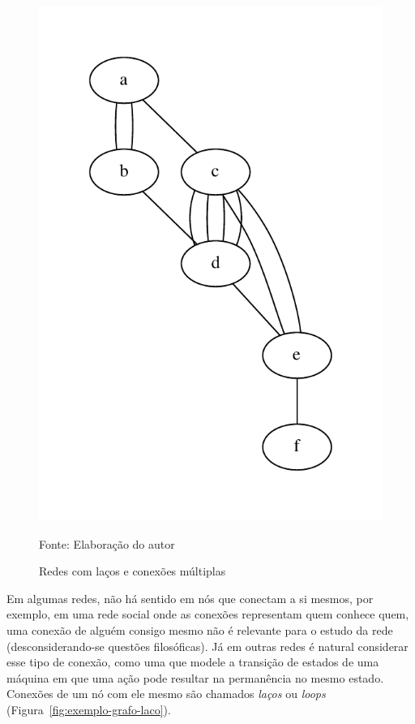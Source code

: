 \documentclass[12pt,a4paper]{article}
\newcommand{\source}[1]{\vspace{-10pt} \caption*{Fonte: {#1}} }
\begin{document}
\begin{figure}[ht]
{        \includegraphics[scale=0.5]{multiple.pdf}
        \label{fig:exemplo-grafo-multiplo}
    }    
    \caption{Redes com laços e conexões múltiplas}
    \source{Elaboração do autor}
\end{figure}

Em algumas redes, não há sentido em nós que conectam a si mesmos, por exemplo, em uma rede social onde as conexões representam quem conhece quem, uma conexão de alguém consigo mesmo não é relevante para o estudo da rede (desconsiderando-se questões filosóficas). Já em outras redes é natural considerar esse tipo de conexão, como uma que modele a transição de estados de uma máquina em que uma ação pode resultar na permanência no mesmo estado. Conexões de um nó com ele mesmo são chamados \textit{laços} ou \textit{loops} (Figura~\ref{fig:exemplo-grafo-laco}).
\end{document}

